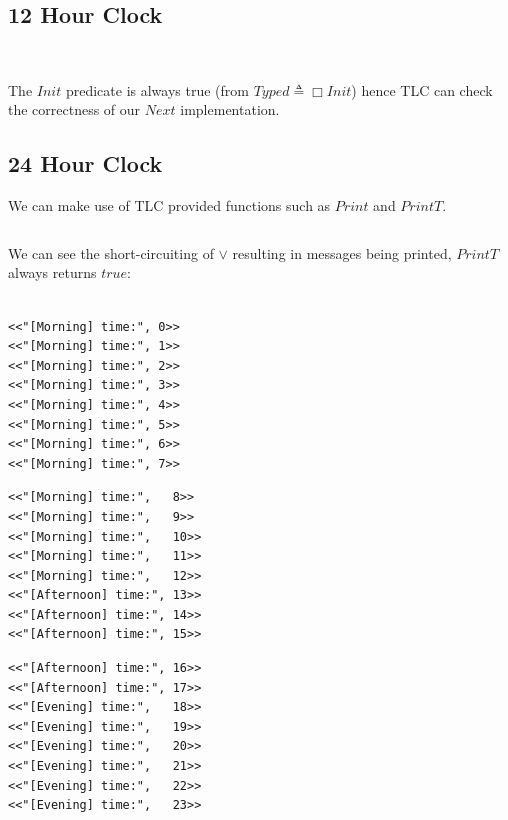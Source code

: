 \subsection{12 Hour Clock}
\begin{minipage}{.48\textwidth}
    
\end{minipage}
\hfill
\begin{minipage}{.48\textwidth}
    \inputminted{text}{tla_plus/code/TwelveHourClock.tla}
\end{minipage}
\vspace{.3cm}
\\ The $Init$ predicate is always true (from $Typed \triangleq \Box Init$) hence TLC can check the correctness of our $Next$ implementation.

\subsection{24 Hour Clock}
We can make use of TLC provided functions such as $Print$ and $PrintT$.
\\

\inputminted{text}{tla_plus/code/24HourClock.tla}
We can see the short-circuiting of $\lor$ resulting in messages being printed, $PrintT$ always returns $true$:
\\
\\ \begin{minipage}{.33\textwidth}
\begin{verbatim}
<<"[Morning] time:", 0>>
<<"[Morning] time:", 1>>
<<"[Morning] time:", 2>>
<<"[Morning] time:", 3>>
<<"[Morning] time:", 4>>
<<"[Morning] time:", 5>>
<<"[Morning] time:", 6>>
<<"[Morning] time:", 7>>
\end{verbatim}  
\end{minipage}
\begin{minipage}{.33\textwidth}
\begin{verbatim}
<<"[Morning] time:",   8>>
<<"[Morning] time:",   9>>
<<"[Morning] time:",   10>>
<<"[Morning] time:",   11>>
<<"[Morning] time:",   12>>
<<"[Afternoon] time:", 13>>
<<"[Afternoon] time:", 14>>
<<"[Afternoon] time:", 15>>
\end{verbatim}
\end{minipage}
\begin{minipage}{.33\textwidth}
\begin{verbatim}
<<"[Afternoon] time:", 16>>
<<"[Afternoon] time:", 17>>
<<"[Evening] time:",   18>>
<<"[Evening] time:",   19>>
<<"[Evening] time:",   20>>
<<"[Evening] time:",   21>>
<<"[Evening] time:",   22>>
<<"[Evening] time:",   23>>
\end{verbatim}
\end{minipage}

